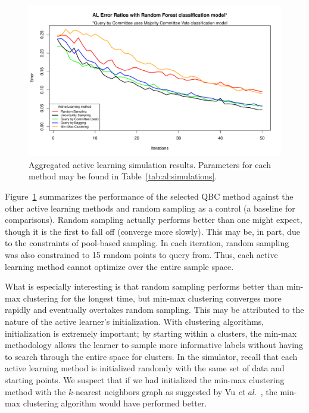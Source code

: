 \begin{figure}[htb]
	\begin{center}
		\includegraphics[width=1\linewidth,page=1]{ch-al/figures/results.pdf}
		\caption[Aggregated active learning simulation results.]{ 
		Aggregated active learning simulation results. Parameters for each 
		method may be found in Table~\ref{tab:al:simulations}.}
		\label{fig:al:simulations:results}
	\end{center}
\end{figure}

Figure~\ref{fig:al:simulations:results} summarizes the performance of the 
selected QBC method against the other active learning methods and random 
sampling as a control (a baseline for comparisons). Random sampling actually 
performs better than one might expect, though it is the first to fall off 
(converge more slowly). This may be, in part, due to the constraints of 
pool-based sampling. In each iteration, random sampling was also constrained to 
15 random points to query from. Thus, each active learning method cannot 
optimize over the entire sample space.

What is especially interesting is that random 
sampling performs better than min-max clustering for the longest time, but 
min-max clustering converges more rapidly and eventually overtakes random 
sampling. This may be attributed to the nature of the active learner's 
initialization. With clustering algorithms, initialization is extremely 
important; by starting within a clusters, the min-max methodology 
allows the learner to sample more informative labels 
without having to search through the entire space for clusters. 
In the simulator, recall that each active learning method is initialized 
randomly with the same set of data and starting points. We suspect that if we 
had initialized the min-max clustering method with the $k$-nearest neighbors 
graph as suggested by Vu \textit{et al.}~\cite{vu2010}, the min-max 
clustering algorithm would have performed better. 

